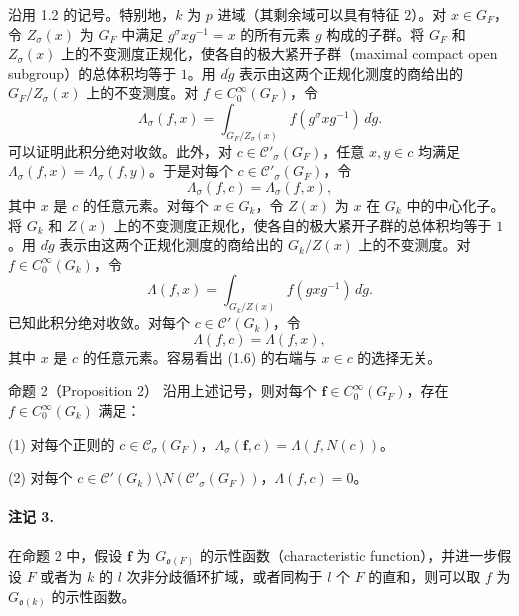 沿用 1.2 的记号。特别地，$k$ 为 $p$ 进域（其剩余域可以具有特征 $2$）。对 $x\in G_F$，令 $Z_\sigma(x)$ 为 $G_F$ 中满足 $g^\sigma xg^{-1}=x$ 的所有元素 $g$ 构成的子群。将 $G_F$ 和 $Z_\sigma(x)$ 上的不变测度正规化，使各自的极大紧开子群（maximal compact open subgroup）的总体积均等于 $1$。用 $d\dot g$ 表示由这两个正规化测度的商给出的 $G_F/Z_\sigma(x)$ 上的不变测度。对 $f\in C_0^\infty(G_F)$，令
\begin{equation}
 \Lambda_\sigma(f,x)=\int_{G_F/Z_\sigma(x)}f(g^\sigma xg^{-1})\,d\dot g.
 \tag{1.3}
\end{equation}
可以证明此积分绝对收敛。此外，对 $c\in\mathcal C'_\sigma(G_F)$，任意 $x,y\in c$ 均满足 $\Lambda_\sigma(f,x)=\Lambda_\sigma(f,y)$。于是对每个 $c\in\mathcal C'_\sigma(G_F)$，令
\begin{equation}
 \Lambda_\sigma(f,c)=\Lambda_\sigma(f,x),
 \tag{1.4}
\end{equation}
其中 $x$ 是 $c$ 的任意元素。对每个 $x\in G_k$，令 $Z(x)$ 为 $x$ 在 $G_k$ 中的中心化子。将 $G_k$ 和 $Z(x)$ 上的不变测度正规化，使各自的极大紧开子群的总体积均等于 $1$。用 $d\dot g$ 表示由这两个正规化测度的商给出的 $G_k/Z(x)$ 上的不变测度。对 $f\in C_0^\infty(G_k)$，令
\begin{equation}
 \Lambda(f,x)=\int_{G_k/Z(x)}f(gxg^{-1})\,d\dot g.
 \tag{1.5}
\end{equation}
已知此积分绝对收敛。对每个 $c\in\mathcal C'(G_k)$，令
\begin{equation}
 \Lambda(f,c)=\Lambda(f,x),
 \tag{1.6}
\end{equation}
其中 $x$ 是 $c$ 的任意元素。容易看出 (1.6) 的右端与 $x\in c$ 的选择无关。

\begin{originaltheorem}{命题 2（Proposition 2）}
沿用上述记号，则对每个 $\boldsymbol f\in C_0^\infty(G_F)$，存在 $f\in C_0^\infty(G_k)$ 满足：

(1) 对每个正则的 $c\in\mathcal C_\sigma(G_F)$，$\Lambda_\sigma(\boldsymbol f,c)=\Lambda(f,N(c))$。

(2) 对每个 $c\in\mathcal C'(G_k)\setminus N(\mathcal C'_\sigma(G_F))$，$\Lambda(f,c)=0$。
\end{originaltheorem}

\paragraph*{注记 3.}
在命题 2 中，假设 $\boldsymbol f$ 为 $G_{\mathfrak o(F)}$ 的示性函数（characteristic function），并进一步假设 $F$ 或者为 $k$ 的 $l$ 次非分歧循环扩域，或者同构于 $l$ 个 $F$ 的直和，则可以取 $f$ 为 $G_{\mathfrak o(k)}$ 的示性函数。

